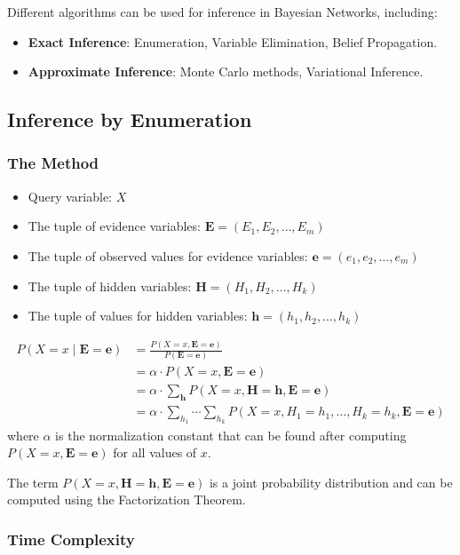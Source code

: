 \documentclass[10pt,UTF8]{article}
\theoremstyle{definition}
\newtheorem{definition inner}{Definition}[section]
\theoremstyle{definition}
\newtheorem{theorem inner}{Theorem}[section]
\theoremstyle{definition}
\newtheorem*{proof inner}{\textit{Proof}}
\theoremstyle{plain}
\newtheorem{tip inner}{Tip}[section]
\theoremstyle{remark}
\begin{document}
\noindent
Different algorithms can be used for inference in Bayesian Networks, including:
\begin{itemize}
  \item \textbf{Exact Inference}: Enumeration, Variable Elimination,
    Belief Propagation.
  \item \textbf{Approximate Inference}: Monte Carlo methods,
    Variational Inference.
\end{itemize}

\subsection{Inference by Enumeration}

\subsubsection{The Method}

\begin{itemize}
  \item Query variable: \(X\)
  \item The tuple of evidence variables: \(\bm{E} = (E_1, E_2, \ldots, E_m)\)
  \item The tuple of observed values for evidence variables: \(\bm{e}
    = (e_1, e_2, \ldots, e_m)\)
  \item The tuple of hidden variables: \(\bm{H} = (H_1, H_2, \ldots, H_k)\)
  \item The tuple of values for hidden variables: \(\bm{h} = (h_1,
    h_2, \ldots, h_k)\)
\end{itemize}
\begin{align*}
  P(X = x \mid \bm{E}=\bm{e})
  & = \frac{P(X=x, \bm{E}=\bm{e})}{P(\bm{E}=\bm{e})}
  \\
  & = \alpha \cdot P(X=x, \bm{E}=\bm{e})
  \\
  & = \alpha \cdot \sum_{\bm{h}} P(X=x, \bm{H}=\bm{h}, \bm{E}=\bm{e})
  \\
  & = \alpha \cdot \sum_{h_1} \cdots \sum_{h_k} P(X=x, H_1=h_1,
  \ldots, H_k=h_k, \bm{E}=\bm{e})
\end{align*}
where \(\alpha \) is the normalization constant that can be found
after computing
\(P(X=x, \bm{E}=\bm{e})\) for all values of \(x\).

\noindent
The term \(P(X=x, \bm{H}=\bm{h}, \bm{E}=\bm{e})\) is a joint
probability distribution and can be computed using the Factorization Theorem.

\subsubsection{Time Complexity}
\end{document}
